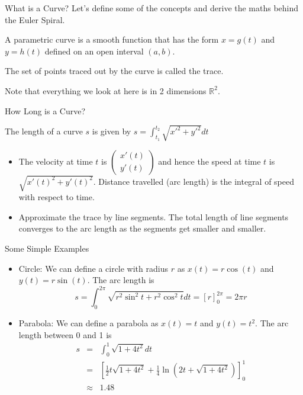 \documentclass{beamer}
\begin{document}
\begin{frame}{What is a Curve?}
	Let's define some of the concepts and derive the maths behind the Euler Spiral.
	
		\begin{definition}
			A parametric curve is a smooth function that has the form
			$x = g(t)$ and $y=h(t)$ defined on an open interval $(a, b)$.
		
			The set of points traced out by the curve is called the trace.
		\end{definition}
		Note that everything we look at here is in 2 dimensions $\mathbb{R}^2$.
	
\end{frame}

\begin{frame}{How Long is a Curve?}
	\begin{definition}
		The length of a curve $s$ is given by
		$s = \int_{t_1}^{t_2} \sqrt{x'^2+y'^2}dt$
	\end{definition}
	\begin{itemize}
		\item 	The velocity at time $t$ is $\left( \begin{array}{c}
			x'(t)\\
			y'(t)
		\end{array} \right)$ and hence the speed at time $t$ is $\sqrt{x'(t)^2+y'(t)^2}$. Distance travelled (arc length) is the integral of speed with respect to time. 
		
		\item Approximate the trace by line segments. The total length of line segments converges to the arc length as the segments get smaller and smaller.
	\end{itemize}

\end{frame}

\begin{frame}{Some Simple Examples}
\begin{itemize}
	
	\item Circle: We can define a circle with radius $r$ as $x(t)=r \cos(t)$ and $y(t)= r \sin(t)$. The arc length is 
	\[
	s = \int_{0}^{2 \pi} \sqrt{r^2 \sin^2 t + r^2 \cos^2 t}dt = \left[r \right]_{0}^{2 \pi} = 2 \pi r
	\]
	
	\item Parabola: We can define a parabola as $x(t)=t$ and $y(t)=t^2$. The arc length between 0 and 1 is 
	\begin{eqnarray*}
	s &=& \int_{0}^{1} \sqrt{1+4t^2}dt \\ &=& \left[\frac{1}{2} t\sqrt{1+ 4 t^2} +\frac{1}{4} \ln \left(2 t+\sqrt{1+ 4 t^2} \right) \right]_{0}^1 \\
	&\approx&	 1.48
	\end{eqnarray*}
\end{itemize}

\end{frame}
\end{document}
